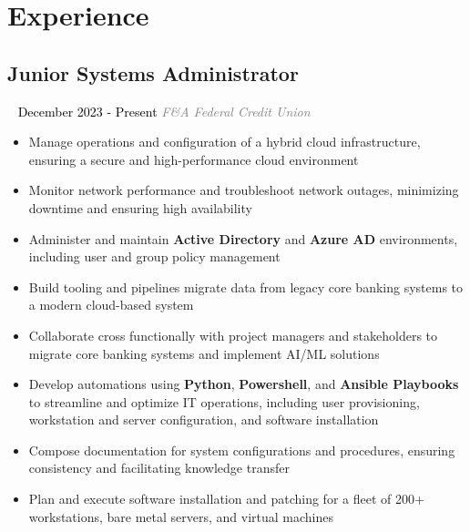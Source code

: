 \documentclass{article}
\newcommand{\resumesection}[3]{
    \subsection*{#1}
    \ 
    \normalsize
    \normalsize
    \hfill
    \textcolor{black}{#3}
    \normalsize
    \newline
    \small
    \textcolor{grey}{\emph{#2}}
}
\begin{document}
\pagestyle{useheader}
\section*{Experience}
\resumesection{Junior Systems Administrator}{F\&A Federal Credit Union}{December 2023 - Present}
\begin{itemize}
    \item Manage operations and configuration of a hybrid cloud infrastructure, ensuring a secure and high-performance cloud environment
    \item Monitor network performance and troubleshoot network outages, minimizing downtime and ensuring high availability
    \item Administer and maintain \textbf{Active Directory} and \textbf{Azure AD} environments, including user and group policy management
    \item Build tooling and pipelines migrate data from legacy core banking systems to a modern cloud-based system
    \item Collaborate cross functionally with project managers and stakeholders to migrate core banking systems and implement AI/ML solutions
    \item Develop automations using \textbf{Python}, \textbf{Powershell}, and \textbf{Ansible Playbooks} to streamline and optimize IT operations, including user provisioning, workstation and server configuration, and software installation
    \item Compose documentation for system configurations and procedures, ensuring consistency and facilitating knowledge transfer
    \item Plan and execute software installation and patching for a fleet of 200+ workstations, bare metal servers, and virtual machines
\end{itemize}
\end{document}

